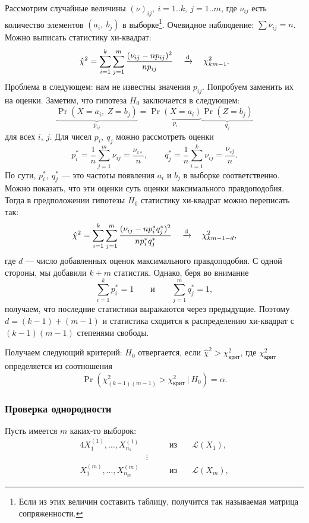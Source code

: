 Рассмотрим случайные величины $(\nu)_{ij},\ i = 1..k,\ j = 1..m$, где
$\nu_{ij}$ есть количество элементов $(a_i,\ b_j)$ в выборке\footnote{
Если из этих величин составить таблицу, получится так называемая
матрица сопряженности.}. Очевидное наблюдение: $\sum \nu_{ij} = n$.
Можно выписать статистику хи-квадрат:
\[
    \hat{\chi}^2 = \sum_{i=1}^k \sum_{j=1}^m \frac{(\nu_{ij} -
    np_{ij})^2}{np_{ij}} \quad \xrightarrow{\mathrm{d}} \quad \chi^2_{km-1}.
    \]
Проблема в следующем: нам не известны значения $p_{ij}$. Попробуем
заменить их на оценки. Заметим, что гипотеза $H_0$ заключается в
следующем:
\[
    \underbrace{\Pr(X = a_i,\ Z = b_j)}_{p_{ij}} = \underbrace{\Pr(
    X = a_i)}_{p_i} \underbrace{\Pr(Z = b_j)}_{q_j}
    \]
для всех $i,\ j$. Для чисел $p_i,\ q_j$ можно рассмотреть оценки
\[
    p_i^* = \frac1n \sum_{j=1}^m \nu_{ij} = \frac{\nu_{i\circ}}n,
    \qquad q_j^* = \frac1n \sum_{i=1}^k \nu_{ij} = \frac{ 
    \nu_{\circ j}}n.
    \]
По сути, $p_i^*,\ q_j^*$ --- это частоты появления $a_i$ и $b_j$
в выборке соответственно. Можно показать, что эти оценки суть
оценки максимального правдоподобия. Тогда в предположении гипотезы
$H_0$ статистику хи-квадрат можно переписать так:
\[
    \hat{\chi}^2 = \sum_{i=1}^k \sum_{j=1}^m \frac{(\nu_{ij} -
    np_i^*q_j^*)^2}{np_i^*q_j^*} \quad \xrightarrow{\mathrm{d}} \quad \chi^2_{km-1-d},
    \]
где $d$ --- число добавленных оценок максимального правдоподобия.
С одной стороны, мы добавили $k + m$ статистик. Однако, беря
во внимание
\[
    \sum_{i=1}^k p_i^* = 1 \qquad \text{и} \qquad
    \sum_{j=1}^m q_j^* = 1,
    \]
получаем, что последние статистики выражаются через предыдущие.
Поэтому $d = (k - 1) + (m - 1)$ и статистика сходится к
распределению хи-квадрат с $(k-1)(m-1)$ степенями свободы.

Получаем следующий критерий: $H_0$ отвергается, если
$\hat{\chi}^2 > \chi^2_{\text{крит}}$, где $\chi^2_{\text{крит}}$
определяется из соотношения
\[
    \Pr(\chi^2_{(k-1)(m-1)} > \chi^2_{\text{крит}}\ |\ H_0) = \alpha.
    \]

\subsubsection{Проверка однородности}

Пусть имеется $m$ каких-то выборок:
\begin{alignat}{4}
    X_1^{(1)}, \ldots, X_{n_1}^{(1)} & \qquad & \text{из} & \quad \mathcal{L}(X_1),\\
    & \vdots & &\\
    X_1^{(m)}, \ldots, X_{n_m}^{(m)} & \qquad & \text{из} & \quad \mathcal{L}(X_m),
\end{alignat}

